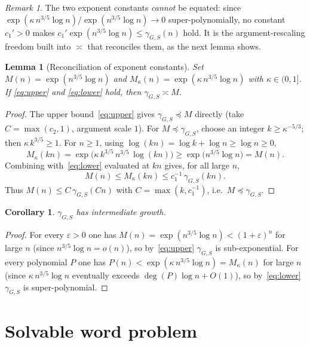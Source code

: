 \documentclass[reqno]{amsart}
\theoremstyle{plain}
\newtheorem{lemma}[theorem]{Lemma}
\newtheorem{corollary}[theorem]{Corollary}
\theoremstyle{definition}
\theoremstyle{remark}
\newtheorem{remark}[theorem]{Remark}
\newcommand{\geod}{\gamma}
\begin{document}
\begin{remark}
The two exponent constants \emph{cannot} be equated: since
$\exp(\kappa\,n^{3/5}\log n)/\exp(n^{3/5}\log n)\to0$ super-polynomially, no constant $c_1'>0$
makes $c_1'\exp(n^{3/5}\log n)\le\geod_{G,S}(n)$ hold. It is the argument-rescaling freedom built
into $\asymp$ that reconciles them, as the next lemma shows.
\end{remark}

\begin{lemma}[Reconciliation of exponent constants]
\label{lem:coarse}
Set $M(n)=\exp(n^{3/5}\log n)$ and $M_\kappa(n)=\exp(\kappa\, n^{3/5}\log n)$ with $\kappa\in(0,1]$.
If \eqref{eq:upper} and \eqref{eq:lower} hold, then $\geod_{G,S}\asymp M$.
\end{lemma}

\begin{proof}
The upper bound~\eqref{eq:upper} gives $\geod_{G,S}\preceq M$ directly (take $C=\max(c_2,1)$,
argument scale $1$). For $M\preceq \geod_{G,S}$, choose an integer $k\ge\kappa^{-5/3}$; then
$\kappa\,k^{3/5}\ge1$. For $n\ge1$, using $\log(kn)=\log k+\log n\ge\log n\ge0$,
\[
  M_\kappa(kn)=\exp\!\bigl(\kappa\,k^{3/5}\,n^{3/5}\,\log(kn)\bigr)
  \ge\exp\!\bigl(n^{3/5}\log n\bigr)=M(n).
\]
Combining with~\eqref{eq:lower} evaluated at $kn$ gives, for all large $n$,
\[
  M(n)\le M_\kappa(kn)\le c_1^{-1}\,\geod_{G,S}(kn).
\]
Thus $M(n)\le C\,\geod_{G,S}(Cn)$ with $C=\max(k,c_1^{-1})$, i.e.\ $M\preceq\geod_{G,S}$.
\end{proof}

\begin{corollary}
\label{cor:inter}
$\geod_{G,S}$ has intermediate growth.
\end{corollary}

\begin{proof}
For every $\varepsilon>0$ one has $M(n)=\exp(n^{3/5}\log n)<(1+\varepsilon)^n$ for large $n$
(since $n^{3/5}\log n=o(n)$), so by~\eqref{eq:upper} $\geod_{G,S}$ is sub-exponential. For every
polynomial $P$ one has $P(n)<\exp(\kappa\,n^{3/5}\log n)=M_\kappa(n)$ for large $n$ (since
$\kappa\,n^{3/5}\log n$ eventually exceeds $\deg(P)\log n+O(1)$), so by~\eqref{eq:lower}
$\geod_{G,S}$ is super-polynomial.
\end{proof}

\section{Solvable word problem}
\label{sec:wp}
\end{document}

